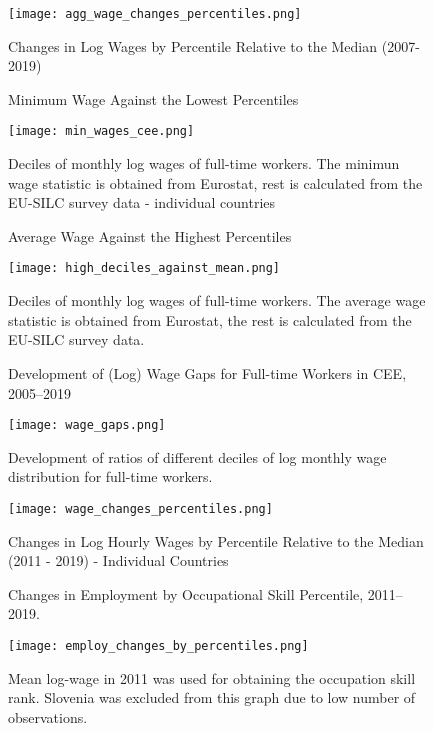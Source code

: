 \documentclass[11pt]{article}
\begin{document}
\begin{figure}[!htbp]%
    \centering
    \caption{Changes in Log Wages by Percentile Relative to the Median (2007-2019)}
    {\texttt{[image: agg\_wage\_changes\_percentiles.png]} }
    \label{agg_wage_changes_percentiles}
\end{figure}



\begin{figure}[!htbp]%
    \centering
    \caption{Minimum  Wage Against the Lowest Percentiles}
    {\texttt{[image: min\_wages\_cee.png]} }
    \label{low_deciles_vs_min_w_cee}
    \caption*{Deciles of monthly log wages of full-time workers. The minimun wage statistic is obtained from Eurostat, rest is calculated from the EU-SILC survey data - individual countries}
\end{figure}


\begin{figure}[!htbp]%
    \centering
    \caption{Average Wage Against the Highest Percentiles}
    {\texttt{[image: high\_deciles\_against\_mean.png]} }
    \label{high_deciles_vs_meam_w_cee}
    \caption*{\footnotesize Deciles of monthly log wages of full-time workers. The average wage statistic is obtained from Eurostat, the rest is calculated from the EU-SILC survey data. }
\end{figure}



\begin{figure}[!htbp]%
    \centering
    \caption{Development of (Log) Wage Gaps for Full-time Workers in CEE, 2005–2019}
    {\texttt{[image: wage\_gaps.png]} }
    \label{wage_gaps_CEE}
    \caption*{\footnotesize Development of ratios of different deciles of log monthly wage distribution for full-time workers. }
\end{figure}

\begin{figure}[!htbp]%
    \centering
    \caption{Changes in Log Hourly Wages by Percentile Relative to the Median (2011 - 2019) - Individual Countries}
    {\texttt{[image: wage\_changes\_percentiles.png]} }
    \label{wage_changes_percentiles}
\end{figure}

\begin{figure}[!htbp]%
    \centering
    \caption{Changes in Employment by Occupational Skill Percentile, 2011–2019.}
    {\texttt{[image: employ\_changes\_by\_percentiles.png]}
    }
    \label{employ_changes_percentiles}
    \caption*{\footnotesize Mean log-wage in 2011 was used for obtaining the occupation skill rank. Slovenia was excluded from this graph due to low number of observations. }
\end{figure}
\end{document}
